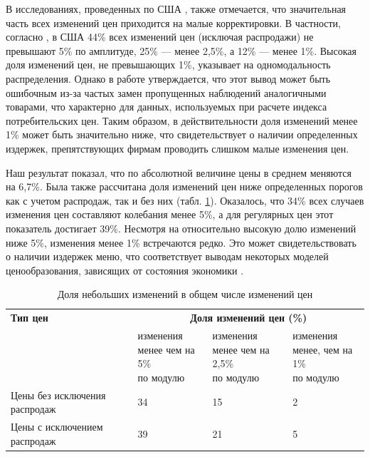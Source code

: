 В исследованиях, проведенных по США \cite{KlenowMalin2010, Midrigan2011}, также отмечается, что значительная часть всех изменений цен приходится на малые корректировки. В частности, согласно \cite{KlenowKryvtsov2008}, в США 44\% всех изменений цен (исключая распродажи) не превышают 5\% по амплитуде, 25\% — менее 2,5\%, а 12\% — менее 1\%. Высокая доля изменений цен, не превышающих 1\%, указывает на одномодальность распределения. Однако в работе \cite{cavallo2018scraped} утверждается, что этот вывод может быть ошибочным из-за частых замен пропущенных наблюдений аналогичными товарами, что характерно для данных, используемых при расчете индекса потребительских цен. Таким образом, в действительности доля изменений менее 1\% может быть значительно ниже, что свидетельствует о наличии определенных издержек, препятствующих фирмам проводить слишком малые изменения цен.


Наш результат показал, что по абсолютной величине цены в среднем меняются на 6,7\%. Была также рассчитана доля изменений цен ниже определенных порогов как с учетом распродаж, так и без них (табл. \ref{tab:small_price_changes}). Оказалось, что 34\% всех случаев изменения цен составляют колебания менее 5\%, а для регулярных цен этот показатель достигает 39\%. Несмотря на относительно высокую долю изменений ниже 5\%, изменения менее 1\% встречаются редко. Это может свидетельствовать о наличии издержек меню, что соответствует выводам некоторых моделей ценообразования, зависящих от состояния экономики \cite{golosov2007, Midrigan2011}.

\begin{table}[h]
	\centering
	\small %
	\caption{Доля небольших изменений в общем числе изменений цен}
	\label{tab:small_price_changes}
	\begin{tabularx}{\textwidth}{|X|X|X|X|} %
		\hline
		\textbf{Тип цен} & \multicolumn{3}{c|}{\textbf{Доля изменений цен (\%)}} \\
		\cline{2-4}
		& \makecell{изменения \\ менее чем на 5\% \\ по модулю} 
		& \makecell{изменения \\ менее чем на 2,5\% \\ по модулю} 
		& \makecell{изменения \\ менее, чем на 1\% \\ по модулю} \\
		\hline
		Цены без исключения распродаж & 34 & 15 & 2 \\
		\hline
		Цены с исключением распродаж & 39 & 21 & 5 \\
		\hline
	\end{tabularx}
\end{table}

